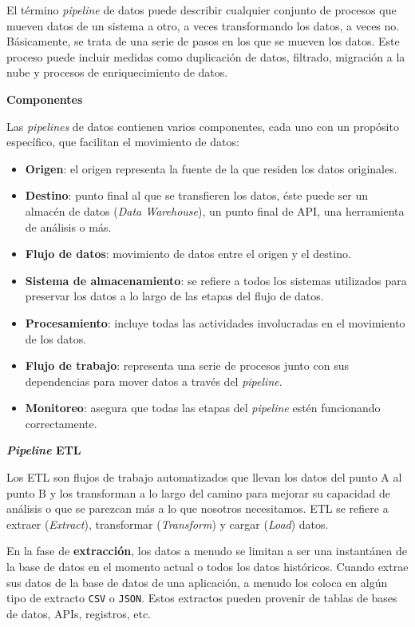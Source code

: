 \documentclass[a4paper,12pt]{article}
\begin{document}
		El término \textit{pipeline} de datos puede describir cualquier conjunto de procesos que mueven datos de un sistema a otro, a veces transformando los datos, a veces no. Básicamente, se trata de una serie de pasos en los que se mueven los datos. Este proceso puede incluir medidas como duplicación de datos, filtrado, migración a la nube y procesos de enriquecimiento de datos. \citep{Tobin2020Jun}
		
		\textbf{Componentes}
		
		Las \textit{pipelines} de datos contienen varios componentes, cada uno con un propósito específico, que facilitan el movimiento de datos:
		\begin{itemize}[noitemsep, topsep=2pt]
			\item \textbf{Origen}: el origen representa la fuente de la que residen los datos originales.
			\item \textbf{Destino}: punto final al que se transfieren los datos, éste puede ser un almacén de datos (\textit{Data Warehouse}), un punto final de API, una herramienta de análisis o más.
			\item \textbf{Flujo de datos}: movimiento de datos entre el origen y el destino.
			\item \textbf{Sistema de almacenamiento}: se refiere a todos los sistemas utilizados para preservar los datos a lo largo de las etapas del flujo de datos.
			\item \textbf{Procesamiento}: incluye todas las actividades involucradas en el movimiento de los datos.
			\item \textbf{Flujo de trabajo}: representa una serie de procesos junto con sus dependencias para mover datos a través del \textit{pipeline}.
			\item \textbf{Monitoreo}: asegura que todas las etapas del \textit{pipeline} estén funcionando correctamente.
		\end{itemize}
		
		\textbf{\textit{Pipeline} ETL}
		
		Los ETL son flujos de trabajo automatizados que llevan los datos del punto A al punto B y los transforman a lo largo del camino para mejorar su capacidad de análisis o que se parezcan más a lo que nosotros necesitamos. ETL se refiere a extraer (\textit{Extract}), transformar (\textit{Transform}) y cargar (\textit{Load}) datos. \citep{SeattleDataGuy}
		
		En la fase de \textbf{extracción}, los datos a menudo se limitan a ser una instantánea de la base de datos en el momento actual o todos los datos históricos. Cuando extrae sus datos de la base de datos de una aplicación, a menudo los coloca en algún tipo de extracto \texttt{CSV} o \texttt{JSON}. Estos extractos pueden provenir de tablas de bases de datos, APIs, registros, etc.
		
\end{document}
